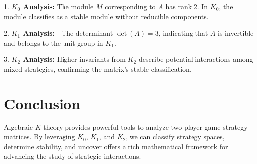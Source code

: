 \documentclass[12pt]{article}
\begin{document}
1. \textbf{\( K_0 \) Analysis:}
The module \( M \) corresponding to \( A \) has rank 2.
In \( K_0 \), the module classifies as a stable module without
    reducible components.

2. \textbf{\( K_1 \) Analysis:}
   - The determinant \( \det(A) = 3 \), indicating that \( A \) is 
   invertible and belongs to the unit group in \( K_1 \).

3. \textbf{\( K_2 \) Analysis:}
Higher invariants from \( K_2 \) describe potential interactions 
among mixed strategies, confirming the matrix's stable classification.

\section*{Conclusion}
Algebraic \( K \)-theory provides powerful tools to analyze two-player
 game strategy matrices. By leveraging \( K_0 \), \( K_1 \), and \( K_2 \),
  we can classify strategy spaces, determine stability, and uncover
offers a rich mathematical framework for advancing the study of 
strategic interactions.
\end{document}
